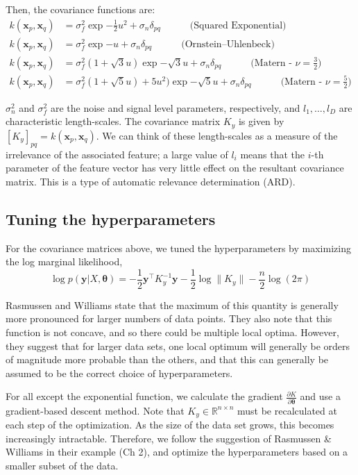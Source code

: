 \documentclass{article} %
\def\bfx{\mathbf x}
\def\bfy{\mathbf y}
\def\bftheta{\mathbf \theta}
\def\R{\mathbb R}
\begin{document}
Then, the covariance functions are:
\begin{align}
	k(\bfx_p, \bfx_q) &= \sigma_f^2 \exp{- \frac{1}{2} u^2} + \sigma_n \delta_{pq} \quad \quad \quad \mbox{(Squared Exponential)}   \\
	k(\bfx_p, \bfx_q) &= \sigma_f^2 \exp{- u} + \sigma_n \delta_{pq} \quad \quad \quad \mbox{(Ornstein–Uhlenbeck)}   \\
	k(\bfx_p, \bfx_q) &= \sigma_f^2 \left( 1 + \sqrt{3} u \right) \exp{- \sqrt{3}  u} + \sigma_n \delta_{pq} \quad \quad \quad \mbox{(Matern - $\nu = \frac{3}{2}$)}   \\
	k(\bfx_p, \bfx_q) &= \sigma_f^2 \left( 1 + \sqrt{5} u \right) + 5 u^2) \exp{- \sqrt{5} u} + \sigma_n \delta_{pq} \quad \quad \quad \mbox{(Matern  - $\nu = \frac{5}{2}$)}
\end{align}

$\sigma_n^2$ and $\sigma_f^2$ are the noise and signal level parameters, respectively, and $l_1, \dots, l_D$ are characteristic length-scales.
The covariance matrix $K_y$ is given by $[K_y]_{pq} = k(\bfx_p, \bfx_q)$.
We can think of these length-scales as a measure of the irrelevance of the associated feature; a large value of $l_i$ means that the $i$-th parameter of the feature vector has very little effect on the resultant covariance matrix.
This is a type of automatic relevance determination (ARD).


\subsection{Tuning the hyperparameters}
For the covariance matrices above, we tuned the hyperparameters by maximizing the log marginal likelihood, 
\begin{equation}
	\log p(\bfy | X, \bftheta) = - \frac{1}{2} \bfy^\top K_y^{-1} \bfy - \frac{1}{2} \log \| K_y \| - \frac{n}{2} \log (2 \pi)
\end{equation}

Rasmussen and Williams state that the maximum of this quantity is generally more pronounced for larger numbers of data points.
They also note that this function is not concave, and so there could be multiple local optima.
However, they suggest that for larger data sets, one local optimum will generally be orders of magnitude more probable than the others, and that this can generally be assumed to be the correct choice of hyperparameters.

For all except the exponential function, we calculate the gradient $\frac{\partial K} {\partial \bftheta}$ and use a gradient-based descent method.
Note that $K_y \in \R^{n \times n}$ must be recalculated at each step of the optimization.
As the size of the data set grows, this becomes increasingly intractable.
Therefore, we follow the suggestion of Rasmussen \& Williams in their example (Ch 2), and optimize the hyperparameters based on a smaller subset of the data.
\end{document}
